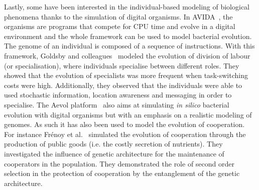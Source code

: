     Lastly, some have been interested in the individual-based modeling of biological phenomena thanks to the simulation of digital organisms. In AVIDA~\parencite{Lenski1999}, the organisms are programs that compete for CPU time and evolve in a digital environment and the whole framework can be used to model bacterial evolution. The genome of an individual is composed of a sequence of instructions. With this framework, Goldsby and colleagues~\parencite{Goldsby2012} modeled the evolution of division of labour (or specialisation), where individuals specialise between different roles. They showed that the evolution of specialists was more frequent when task-switching costs were high. Additionally, they observed that the individuals were able to used stochastic information, location awareness and messaging in order to specialise. The Aevol platform~\parencite{Knibbe2005, Batut2013} also aims at simulating \emph{in silico} bacterial evolution with digital organisms but with an emphasis on a realistic modeling of genomes. As such it has also been used to model the evolution of cooperation. For instance Fr\'{e}noy et al.~\parencite{Frenoy2013} simulated the evolution of cooperation through the production of public goods (i.e. the costly secretion of nutrients). They investigated the influence of genetic architecture for the maintenance of cooperators in the population. They demonstrated the role of second order selection in the protection of cooperation by the entanglement of the genetic architecture.




